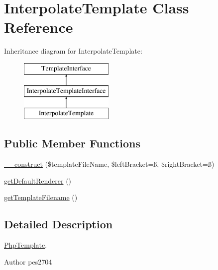 \hypertarget{class_pes_1_1_view_1_1_template_1_1_interpolate_template}{}\section{Interpolate\+Template Class Reference}
\label{class_pes_1_1_view_1_1_template_1_1_interpolate_template}
Inheritance diagram for Interpolate\+Template\+:\begin{figure}[H]
\begin{center}
\leavevmode
\includegraphics[height=3.000000cm]{class_pes_1_1_view_1_1_template_1_1_interpolate_template}
\end{center}
\end{figure}
\subsection*{Public Member Functions}
\begin{DoxyCompactItemize}
\item 
\mbox{\hyperlink{class_pes_1_1_view_1_1_template_1_1_interpolate_template_a1a67eacb1875ee863fae57b5298547b8}{\+\_\+\+\_\+construct}} (\$template\+File\+Name, \$left\+Bracket=\textquotesingle{}ß\textquotesingle{}, \$right\+Bracket=\textquotesingle{}ß\textquotesingle{})
\item 
\mbox{\hyperlink{class_pes_1_1_view_1_1_template_1_1_interpolate_template_a5f55a7569860e76380abf2728abc56d5}{get\+Default\+Renderer}} ()
\item 
\mbox{\hyperlink{class_pes_1_1_view_1_1_template_1_1_interpolate_template_a487e0913fe1ce30f7cc6e1091abf6fdd}{get\+Template\+Filename}} ()
\end{DoxyCompactItemize}


\subsection{Detailed Description}
\mbox{\hyperlink{class_pes_1_1_view_1_1_template_1_1_php_template}{Php\+Template}}.

\begin{DoxyAuthor}{Author}
pes2704 
\end{DoxyAuthor}


